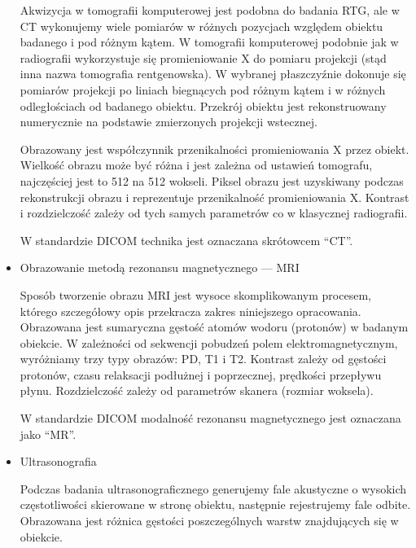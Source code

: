 \begin{itemize}
          Akwizycja w tomografii komputerowej jest podobna do badania RTG, ale w CT wykonujemy wiele pomiarów w różnych pozycjach względem obiektu badanego i pod różnym kątem.
          W tomografii komputerowej podobnie jak w radiografii wykorzystuje się promieniowanie X do pomiaru projekcji (stąd inna nazwa tomografia rentgenowska).
          W wybranej płaszczyźnie dokonuje się pomiarów projekcji po liniach biegnących pod różnym kątem i w różnych odległościach od badanego obiektu.
          Przekrój obiektu jest rekonstruowany numerycznie na podstawie zmierzonych projekcji wstecznej.

          Obrazowany jest współczynnik przenikalności promieniowania X przez obiekt.
          Wielkość obrazu może być różna i jest zależna od ustawień tomografu, najczęściej jest to 512 na 512 wokseli.
          Piksel obrazu jest uzyskiwany podczas rekonstrukcji obrazu i reprezentuje przenikalność promieniowania X.
          Kontrast i rozdzielczość zależy od tych samych parametrów co w klasycznej radiografii.

          W standardzie DICOM technika jest oznaczana skrótowcem \enquote{CT}.

    \item Obrazowanie metodą rezonansu magnetycznego --- MRI

          Sposób tworzenie obrazu MRI jest wysoce skomplikowanym procesem, którego szczegółowy opis przekracza zakres niniejszego opracowania.
          Obrazowana jest sumaryczna gęstość atomów wodoru (protonów) w badanym obiekcie.
          W zależności od sekwencji pobudzeń polem elektromagnetycznym, wyróżniamy trzy typy obrazów: PD, T1 i T2.
          Kontrast zależy od gęstości protonów, czasu relaksacji podłużnej i poprzecznej, prędkości przepływu płynu.
          Rozdzielczość zależy od parametrów skanera (rozmiar woksela).

          W standardzie DICOM modalność rezonansu magnetycznego jest oznaczana jako \enquote{MR}.

    \item Ultrasonografia

          Podczas badania ultrasonograficznego generujemy fale akustyczne o wysokich częstotliwości skierowane w stronę obiektu, następnie rejestrujemy fale odbite.
          Obrazowana jest różnica gęstości poszczególnych warstw znajdujących się w obiekcie.


\end{itemize}
